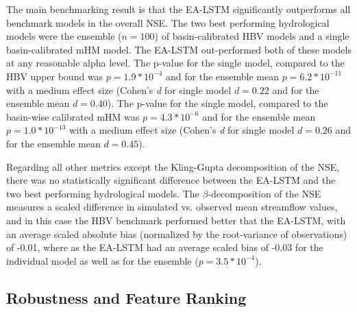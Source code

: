 The main benchmarking result is that the \gls{EA-LSTM} significantly outperforms all benchmark models in the overall \gls{NSE}. 
The two best performing hydrological models were the ensemble ($n=100$) of basin-calibrated HBV models and a single basin-calibrated mHM model. The \gls{EA-LSTM} out-performed both of these models at any reasonable alpha level. The p-value for the single model, compared to the HBV upper bound was $p=1.9*10^{-4}$ and for the ensemble mean $p=6.2*10^{-11}$ with a medium effect size (Cohen’s \textit{d} for single model $d=0.22$ and for the ensemble mean $d=0.40$). The p-value for the single model, compared to the basin-wise calibrated mHM was $p=4.3*10^{-6}$ and for the ensemble mean $p=1.0*10^{-13}$  with a medium effect size (Cohen’s \textit{d} for single model $d=0.26$ and for the ensemble mean $d=0.45$).

Regarding all other metrics except the Kling-Gupta decomposition of the \gls{NSE}, there was no statistically significant difference between the \gls{EA-LSTM} and the two best performing hydrological models. The $\beta$-decomposition of the \gls{NSE} measures a scaled difference in simulated vs. observed mean streamflow values, and in this case the HBV benchmark performed better that the \gls{EA-LSTM}, with an average scaled absolute bias (normalized by the root-variance of observations) of -0.01, where as the \gls{EA-LSTM} had an average scaled bias of -0.03 for the individual model as well as for the ensemble ($p=3.5*10^{-4}$).

\subsection{Robustness and Feature Ranking}\label{sec-robustness}

